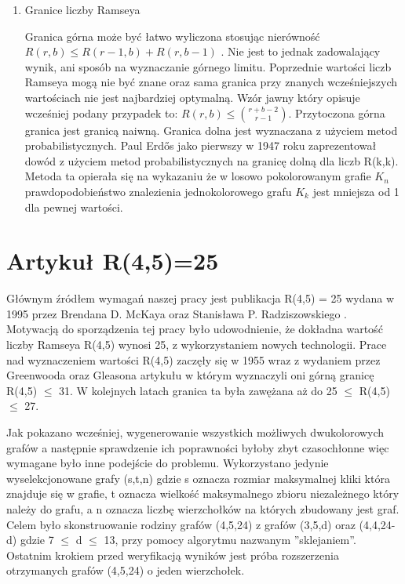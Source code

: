 \documentclass[11pt]{article}
\begin{document}
\begin{enumerate}
\item Granice liczby Ramseya \hfill \par

Granica górna może być łatwo wyliczona stosując nierówność $R(r,b) \le R(r-1,b)+R(r,b-1)$ \cite{graniceupdown}. Nie jest to jednak zadowalający wynik, ani sposób na wyznaczanie górnego limitu. Poprzednie wartości liczb Ramseya mogą nie być znane oraz sama granica przy znanych wcześniejszych wartościach nie jest najbardziej optymalną. Wzór jawny który opisuje wcześniej podany przypadek to: $R(r,b) \le {r+b-2\choose r-1}$. Przytoczona górna granica jest granicą naiwną. Granica dolna jest wyznaczana z użyciem metod probabilistycznych. Paul Erdős jako pierwszy w 1947 roku zaprezentował dowód z użyciem metod probabilistycznych na granicę dolną dla liczb R(k,k)\cite{erdogranica, graniceupdown}. Metoda ta opierała się na wykazaniu że w losowo pokolorowanym grafie $\mathit{K}_{n}$ prawdopodobieństwo znalezienia jednokolorowego grafu $\mathit{K}_{k}$ jest mniejsza od 1 dla pewnej wartości.

\end{enumerate}

\section{Artykuł R(4,5)=25}


Głównym źródłem wymagań naszej pracy jest publikacja R(4,5) = 25 wydana w 1995 przez Brendana D. McKaya oraz Stanisława P. Radziszowskiego  \cite{mainpaper}. Motywacją do sporządzenia tej pracy było udowodnienie, że dokładna wartość liczby Ramseya R(4,5) wynosi 25, z wykorzystaniem nowych technologii. Prace nad wyznaczeniem wartości R(4,5) zaczęły się w 1955 wraz z wydaniem przez Greenwooda oraz Gleasona artykułu w którym wyznaczyli oni górną granicę R(4,5) $\leq$ 31. W kolejnych latach granica ta była zawężana aż do 25 $\leq$ R(4,5) $\leq$ 27.\par
Jak pokazano wcześniej, wygenerowanie wszystkich możliwych dwukolorowych grafów a następnie sprawdzenie ich poprawności byłoby zbyt czasochłonne więc wymagane było inne podejście do problemu. Wykorzystano jedynie wyselekcjonowane grafy (s,t,n) gdzie s oznacza rozmiar maksymalnej kliki która znajduje się w grafie, t oznacza wielkość maksymalnego zbioru niezależnego który należy do grafu, a n oznacza liczbę wierzchołków na których zbudowany jest graf. Celem było skonstruowanie rodziny grafów (4,5,24) z grafów (3,5,d) oraz (4,4,24-d) gdzie 7 $\leq$ d $\leq$ 13, przy pomocy algorytmu nazwanym ''sklejaniem''. Ostatnim krokiem przed weryfikacją wyników jest próba rozszerzenia otrzymanych grafów (4,5,24) o jeden wierzchołek.
\end{document}
